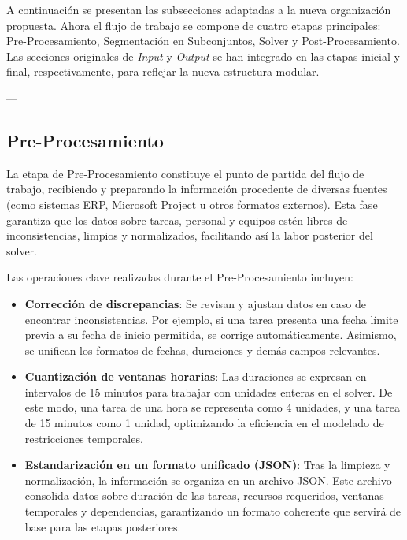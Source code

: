 \documentclass{article}
\begin{document}
A continuación se presentan las subsecciones adaptadas a la nueva organización propuesta. Ahora el flujo de trabajo se compone de cuatro etapas principales: Pre-Procesamiento, Segmentación en Subconjuntos, Solver y Post-Procesamiento. Las secciones originales de \textit{Input} y \textit{Output} se han integrado en las etapas inicial y final, respectivamente, para reflejar la nueva estructura modular.

---

\subsection{Pre-Procesamiento}

La etapa de Pre-Procesamiento constituye el punto de partida del flujo de trabajo, recibiendo y preparando la información procedente de diversas fuentes (como sistemas ERP, Microsoft Project u otros formatos externos). Esta fase garantiza que los datos sobre tareas, personal y equipos estén libres de inconsistencias, limpios y normalizados, facilitando así la labor posterior del solver.

Las operaciones clave realizadas durante el Pre-Procesamiento incluyen:

\begin{itemize}
    \item \textbf{Corrección de discrepancias}: Se revisan y ajustan datos en caso de encontrar inconsistencias. Por ejemplo, si una tarea presenta una fecha límite previa a su fecha de inicio permitida, se corrige automáticamente. Asimismo, se unifican los formatos de fechas, duraciones y demás campos relevantes.

    \item \textbf{Cuantización de ventanas horarias}: Las duraciones se expresan en intervalos de 15 minutos para trabajar con unidades enteras en el solver. De este modo, una tarea de una hora se representa como 4 unidades, y una tarea de 15 minutos como 1 unidad, optimizando la eficiencia en el modelado de restricciones temporales.

    \item \textbf{Estandarización en un formato unificado (JSON)}: Tras la limpieza y normalización, la información se organiza en un archivo JSON. Este archivo consolida datos sobre duración de las tareas, recursos requeridos, ventanas temporales y dependencias, garantizando un formato coherente que servirá de base para las etapas posteriores.

\end{itemize}
\end{document}
